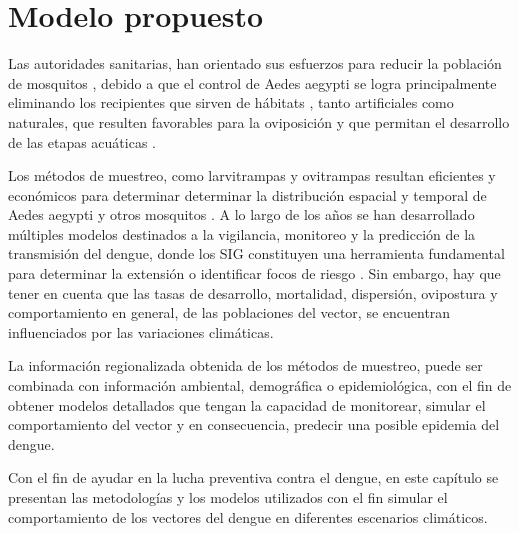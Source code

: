 \chapter{Modelo propuesto}

Las autoridades sanitarias, han orientado sus esfuerzos para reducir la población de mosquitos
\cite{planControlMspbs2014}, debido a que el control de Aedes aegypti se logra principalmente
eliminando los recipientes que sirven de hábitats \cite{world2009dengue}, tanto artificiales como
naturales, que resulten favorables para la oviposición y que permitan el desarrollo de las etapas
acuáticas \cite{world2009dengue, directricesDetvArg}.

Los métodos de muestreo, como larvitrampas y ovitrampas resultan eficientes y económicos para
determinar determinar la distribución espacial y temporal de Aedes aegypti y otros mosquitos
\cite{dengueUruguayCap1, cenaprece2013}. A lo largo de los años se han desarrollado múltiples
modelos destinados a la vigilancia, monitoreo y la predicción de la transmisión del dengue, donde
los SIG constituyen una herramienta fundamental para determinar la extensión o identificar focos
de riesgo \citep{vgomesAegis2001, NINO2011}. Sin embargo, hay que tener en cuenta que las tasas de
desarrollo, mortalidad, dispersión, ovipostura y comportamiento en general, de las poblaciones del
vector, se encuentran influenciados por las variaciones climáticas.

La información regionalizada obtenida de los métodos de muestreo, puede ser combinada con
información ambiental, demográfica o epidemiológica, con el fin de obtener modelos detallados que
tengan la capacidad de monitorear, simular el comportamiento del vector y en consecuencia,
predecir una posible epidemia del dengue.

Con el fin de ayudar en la lucha preventiva contra el dengue, en este capítulo se presentan las
metodologías y los modelos utilizados con el fin simular el comportamiento de los vectores del
dengue en diferentes escenarios climáticos.




